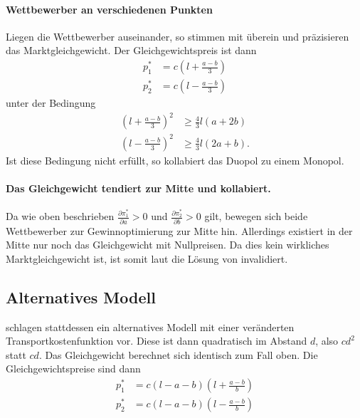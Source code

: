 \paragraph{Wettbewerber an verschiedenen Punkten}
Liegen die Wettbewerber auseinander, so stimmen \citet{aspremont1979} mit \citet{hotelling1929} überein und präzisieren das Marktgleichgewicht.
Der Gleichgewichtspreis ist dann
\begin{equation}
\begin{split}
p_1^* &= c \left(l+\frac{a-b}{3}\right) \\
p_2^* &= c \left(l-\frac{a-b}{3}\right)
\end{split}
\end{equation}
unter der Bedingung
\begin{equation}
\begin{split}
\left(l+\frac{a-b}{3}\right)^2 &\geq \tfrac{4}{3} l (a+2b) \\
\left(l-\frac{a-b}{3}\right)^2 &\geq \tfrac{4}{3} l (2a+b)
.\end{split}
\end{equation}
Ist diese Bedingung nicht erfüllt, so kollabiert das Duopol zu einem Monopol. \citep[S.\,1146]{aspremont1979}

\paragraph{Das Gleichgewicht tendiert zur Mitte und kollabiert.}
Da wie oben beschrieben $\frac{\partial \pi_1^*}{\partial a}>0$ und $\frac{\partial \pi_2^*}{\partial b}>0$ gilt, bewegen sich beide Wettbewerber zur Gewinnoptimierung zur Mitte hin.
Allerdings existiert in der Mitte nur noch das Gleichgewicht mit Nullpreisen.
Da dies kein wirkliches Marktgleichgewicht ist, ist somit laut \citet{aspremont1979} die Lösung von \citet{hotelling1929} invalidiert. \citep[S.\,1147-8]{aspremont1979} 

\subsection{Alternatives Modell}\label{Sec-Aspremont-Modell}
\citet{aspremont1979} schlagen stattdessen ein alternatives Modell mit einer veränderten Transportkostenfunktion vor.
Diese ist dann quadratisch im Abstand $d$, also $cd^2$ statt $cd$.
Das Gleichgewicht berechnet sich identisch zum Fall oben.
Die Gleichgewichtspreise sind dann  \citep[S.\,1149]{aspremont1979}
\begin{equation} \label{eqn:aspremont-prices}
\begin{split}
p_1^* &= c (l-a-b) \left(l+\frac{a-b}{b}\right) \\
p_2^* &= c (l-a-b) \left(l-\frac{a-b}{b}\right)
\end{split}
\end{equation}

